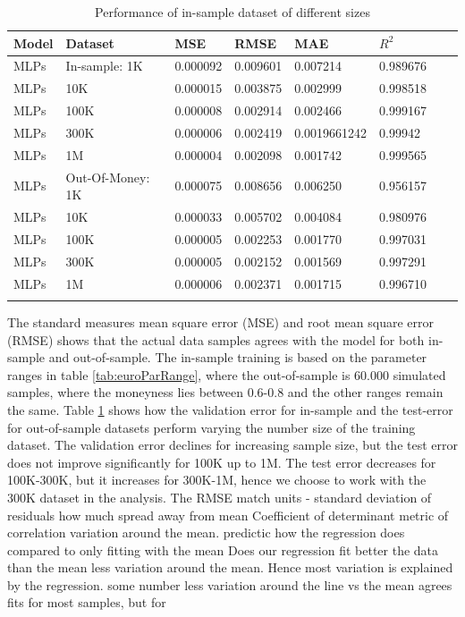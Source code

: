 \begin{table}[H]
\caption{Performance of in-sample dataset of different sizes}
\label{tab:euroDataSize}
\centering
\begin{tabular}{l l l l l l l l }
\toprule
\textbf{Model} & \textbf{Dataset} & \textbf{MSE} & \textbf{RMSE} & \textbf{MAE} & \textbf{$R^2$} \\
\midrule
MLPs & In-sample: 1K & 0.000092 & 0.009601 & 0.007214 & 0.989676\\
MLPs & 10K & 0.000015 & 0.003875 & 0.002999 & 0.998518\\
MLPs & 100K & 0.000008 & 0.002914 & 0.002466 & 0.999167\\
MLPs & 300K & 0.000006 & 0.002419 & 0.0019661242 & 0.99942\\
MLPs & 1M & 0.000004 & 0.002098 & 0.001742 & 0.999565\\
MLPs & Out-Of-Money: 1K & 0.000075 & 0.008656 & 0.006250 & 0.956157\\
MLPs & 10K & 0.000033 & 0.005702 & 0.004084 & 0.980976\\
MLPs & 100K & 0.000005 & 0.002253 & 0.001770 & 0.997031\\
MLPs & 300K & 0.000005 & 0.002152 & 0.001569 & 0.997291\\
MLPs & 1M & 0.000006 & 0.002371 & 0.001715 & 0.996710\\
\bottomrule\\
\end{tabular}
\end{table}
The standard measures mean square error (MSE) and root mean square error (RMSE) shows that the actual data samples agrees with the model for both in-sample and out-of-sample. The in-sample training is based on the parameter ranges in table \ref{tab:euroParRange}, where the out-of-sample is 60.000 simulated samples, where the moneyness lies between 0.6-0.8 and the other ranges remain the same.  Table \ref{tab:euroDataSize} shows how the validation error for in-sample and the test-error for out-of-sample datasets perform varying the number size of the training dataset. The validation error declines for increasing sample size, but the test error does not improve significantly for 100K up to 1M. The test error decreases for 100K-300K, but it increases for 300K-1M, hence we choose to work with the 300K dataset in the analysis. The 
RMSE match units - standard deviation of residuals how much spread away from mean
Coefficient of determinant metric of correlation
variation around the mean.
predictic how the regression does compared to only fitting with the mean
Does our regression fit better the data than the mean
less variation around the mean. Hence most variation is explained by the regression. some number less variation around the line vs the mean
 agrees  fits for most samples, but for 


